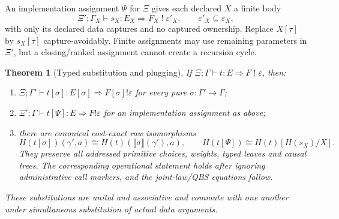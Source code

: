\documentclass[11pt,a4paper]{article}
\newtheorem{theorem}{Theorem}[section]
\theoremstyle{definition}
\newcommand{\den}[1]{\llbracket #1\rrbracket}
\begin{document}
An implementation assignment $\Psi$ for $\Xi$ gives each declared $X$
a finite body
\[
 \Xi';\Gamma_X\vdash s_X:E_X\Rightarrow F_X\;!\;\varepsilon'_X,
 \qquad\varepsilon'_X\subseteq\varepsilon_X,
\]
with only its declared data captures and no captured ownership. Replace
$X[\tau]$ by $s_X[\tau]$ capture-avoidably. Finite assignments may use
remaining parameters in $\Xi'$, but a closing/ranked assignment cannot
create a recursion cycle.

\begin{theorem}[Typed substitution and plugging]\label{thm:substitution}
If $\Xi;\Gamma\vdash t:E\Rightarrow F\;!\;\varepsilon$, then:
\begin{enumerate}[label=\textup{(\roman*)}]
\item $\Xi;\Gamma'\vdash t[\sigma]:E[\sigma]\Rightarrow F[\sigma]
!\varepsilon$ for every pure $\sigma:\Gamma'\to\Gamma$;
\item $\Xi';\Gamma\vdash t[\Psi]:E\Rightarrow F!\varepsilon$ for
an implementation assignment as above;
\item there are canonical cost-exact raw isomorphisms
\[
 H(t[\sigma])(\gamma',a)\cong H(t)(\den\sigma(\gamma'),a),
 \qquad
 H(t[\Psi])\cong H(t)[H(s_X)/X].
\]
They preserve all addressed primitive choices, weights, typed leaves and
causal trees. The corresponding operational statement holds after ignoring
administrative call markers, and the joint-law/QBS equations follow.
\end{enumerate}
These substitutions are unital and associative and commute with one
another under simultaneous substitution of actual data arguments.
\end{theorem}
\end{document}
